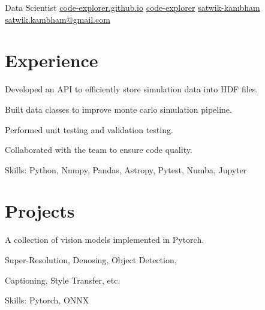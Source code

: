 \documentclass[]{absolute}
\begin{document}
%
%

{Data Scientist}
{\contactline
    {\href{https://code-explorer.github.io/}{code-explorer.github.io}}
    {\href{https://www.github.com/code-explorer}{code-explorer}}
    {\href{https://www.linkedin.com/in/satwik-kambham/}{satwik-kambham}}
    {\href{mailto:satwik.kambham@gmail.com}{satwik.kambham@gmail.com}}
}

%
%

\begin{minipage}[t]{0.65\textwidth}



    \section{Experience}
    \vspace{\topsep}
    \begin{tightemize}
        \sectionsep
        \item Developed an API to efficiently store simulation data into HDF files.
        \item Built data classes to improve monte carlo simulation pipeline.
        \item Performed unit testing and validation testing.
        \item Collaborated with the team to ensure code quality.
        \item Skills: Python, Numpy, Pandas, Astropy, Pytest, Numba, Jupyter
    \end{tightemize}
    \sectionsep



    \section{Projects}

    \begin{tightemize}
        \item A collection of vision models implemented in Pytorch.
        \item Super-Resolution, Denosing, Object Detection,
        \item Captioning, Style Transfer, etc.
        \item Skills: Pytorch, ONNX
    \end{tightemize}
    \sectionsep


\end{minipage}
\end{document}
